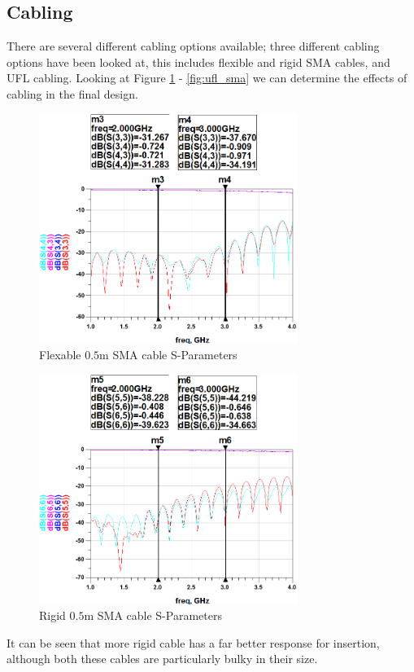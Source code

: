 \documentclass[12pt,openany,a4paper]{book}
\begin{document}
\subsection{Cabling}		\label{sec:res_cabling}
There are several different cabling options available; three different cabling options have been looked at, this includes flexible and rigid SMA cables, and UFL cabling. Looking at Figure \ref{fig:flex_sma} - \ref{fig:ufl_sma} we can determine the effects of cabling in the final design.
\begin{figure}[H]
	\centering
	\includegraphics[width=0.75\textwidth]{SMA-flex.png}
	\caption{Flexable $0.5$m SMA cable S-Parameters}
	\label{fig:flex_sma}
\end{figure} 
\begin{figure}[H]
	\centering
	\includegraphics[width=0.75\textwidth]{SMA-rig.png}
	\caption{Rigid $0.5$m SMA cable S-Parameters}
	\label{fig:rigid_sma}
\end{figure} 
It can be seen that more rigid cable has a far better response for insertion, although both these cables are particularly bulky in their size. 
\end{document}
